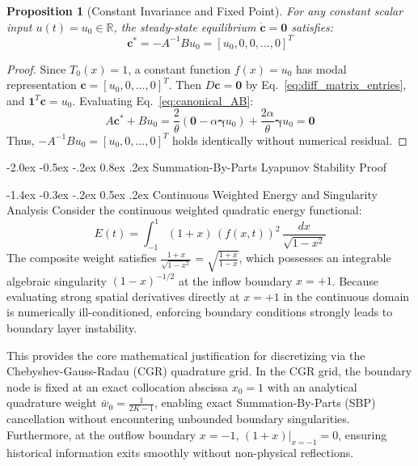 \documentclass[10pt,twocolumn,a4paper]{article}
\makeatletter
\renewcommand\section{\@startsection{section}{1}{\z@}%
  {-2.0ex \@plus -0.5ex \@minus -.2ex}%
  {0.8ex \@plus .2ex}%
  {\normalfont\large\bfseries}}
\renewcommand\subsection{\@startsection{subsection}{2}{\z@}%
  {-1.4ex \@plus -0.3ex \@minus -.2ex}%
  {0.5ex \@plus .2ex}%
  {\normalfont\normalsize\bfseries}}
\theoremstyle{plain}
\newtheorem{proposition}{Proposition}
\theoremstyle{definition}
\makeatother
\begin{document}
\begin{proposition}[Constant Invariance and Fixed Point]
For any constant scalar input $u(t) = u_0 \in \mathbb{R}$, the steady-state equilibrium $\dot{\mathbf{c}} = \mathbf{0}$ satisfies:
\begin{equation}
\mathbf{c}^* = -A^{-1} B u_0 = [u_0, 0, 0, \dots, 0]^T
\end{equation}
\end{proposition}
\begin{proof}
Since $T_0(x) = 1$, a constant function $f(x) = u_0$ has modal representation $\mathbf{c} = [u_0, 0, \dots, 0]^T$. Then $D \mathbf{c} = \mathbf{0}$ by Eq.~\eqref{eq:diff_matrix_entries}, and $\mathbf{1}^T \mathbf{c} = u_0$. Evaluating Eq.~\eqref{eq:canonical_AB}:
\begin{equation*}
A \mathbf{c}^* + B u_0 = \frac{2}{\theta} \left( \mathbf{0} - \alpha \boldsymbol{\gamma} u_0 \right) + \frac{2\alpha}{\theta} \boldsymbol{\gamma} u_0 = \mathbf{0}
\end{equation*}
Thus, $-A^{-1} B u_0 = [u_0, 0, \dots, 0]^T$ holds identically without numerical residual.
\end{proof}

\section{Summation-By-Parts Lyapunov Stability Proof}

\subsection{Continuous Weighted Energy and Singularity Analysis}
Consider the continuous weighted quadratic energy functional:
\begin{equation}
E(t) = \int_{-1}^1 (1 + x) \, (f(x, t))^2 \, \frac{dx}{\sqrt{1 - x^2}}
\label{eq:cont_energy}
\end{equation}
The composite weight satisfies $\frac{1 + x}{\sqrt{1 - x^2}} = \sqrt{\frac{1 + x}{1 - x}}$, which possesses an integrable algebraic singularity $(1 - x)^{-1/2}$ at the inflow boundary $x = +1$. Because evaluating strong spatial derivatives directly at $x = +1$ in the continuous domain is numerically ill-conditioned, enforcing boundary conditions strongly leads to boundary layer instability.

This provides the core mathematical justification for discretizing via the Chebyshev-Gauss-Radau (CGR) quadrature grid. In the CGR grid, the boundary node is fixed at an exact collocation abscissa $x_0 = 1$ with an analytical quadrature weight $\bar{w}_0 = \frac{1}{2K-1}$, enabling exact Summation-By-Parts (SBP) cancellation without encountering unbounded boundary singularities. Furthermore, at the outflow boundary $x = -1$, $(1 + x)|_{x=-1} = 0$, ensuring historical information exits smoothly without non-physical reflections.
\end{document}
